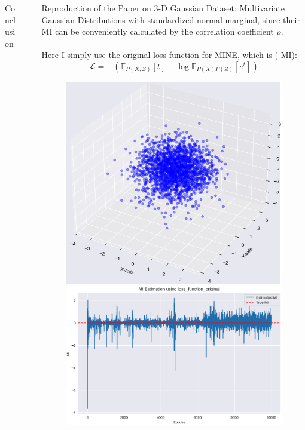 \documentclass[final]{beamer}
\newlength{\sepwidth}
\newlength{\colwidth}
\newcommand{\separatorcolumn}{\begin{column}{\sepwidth}\end{column}}
\begin{document}
\begin{frame}[t]
\begin{columns}[t]
\begin{column}{\colwidth}
\begin{block}{Conclusion}
\end{block}

\end{column}
\separatorcolumn

\begin{column}{\colwidth}

  \begin{block}{Reproduction of the Paper on 3-D Gaussian}
    Dataset: Multivariate Gaussian Distributions with standardized normal marginal, since their MI can be conveniently calculated by the correlation coefficient $\rho$.\\
    ~\\
    Here I simply use the original loss function for MINE, which is (-MI):
    $$\mathcal L = - \left( \mathbb{E}_{P(X, Z)}[t] - \log \mathbb{E}_{P(X)P(Z)}\left[e^{t}\right] \right)$$
    \begin{figure}
    \centering
    \begin{minipage}{0.48\textwidth}
    \centering
    \includegraphics[width=0.9\linewidth]{截屏2024-12-31 12.07.47.png}
    \end{minipage}
    \begin{minipage}{0.5\textwidth}
    \centering
    \centering
    \includegraphics[width=0.9\linewidth]{figures/截屏2024-12-31 12.12.17.png}

\end{minipage}
\end{figure}
\end{block}
\end{column}
\end{columns}
\end{frame}
\end{document}
